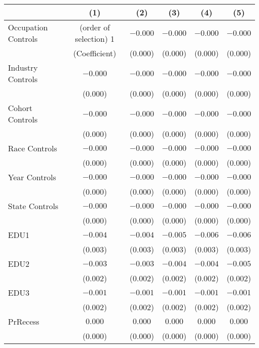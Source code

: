 \documentclass[12pt]{article}
\begin{document}
\begin{table}[ht]
\begin{tabular}{lccccc}
\toprule
                    & (1)     & (2)   & (3)    & (4)      & (5)         \\
\midrule
Occupation Controls      & (order of selection) 1  & $-0.000$    & $-0.000$  & $-0.000$   & $-0.000$    \\
                    & (Coefficient)   & (0.000)     & (0.000)   & (0.000)    & (0.000)     \\
Industry Controls      & $-0.000$  & $-0.000$    & $-0.000$  & $-0.000$   & $-0.000$    \\
                    & (0.000)   & (0.000)     & (0.000)   & (0.000)    & (0.000)     \\
Cohort Controls      & $-0.000$  & $-0.000$    & $-0.000$  & $-0.000$   & $-0.000$    \\
                    & (0.000)   & (0.000)     & (0.000)   & (0.000)    & (0.000)     \\
Race Controls      & $-0.000$  & $-0.000$    & $-0.000$  & $-0.000$   & $-0.000$    \\
                    & (0.000)   & (0.000)     & (0.000)   & (0.000)    & (0.000)     \\
Year Controls      & $-0.000$  & $-0.000$    & $-0.000$  & $-0.000$   & $-0.000$    \\
                    & (0.000)   & (0.000)     & (0.000)   & (0.000)    & (0.000)     \\
State Controls      & $-0.000$  & $-0.000$    & $-0.000$  & $-0.000$   & $-0.000$    \\
                    & (0.000)   & (0.000)     & (0.000)   & (0.000)    & (0.000)     \\
EDU1                & $-0.004$  & $-0.004$    & $-0.005$  & $-0.006$   & $-0.006$    \\
                    & (0.003)   & (0.003)     & (0.003)   & (0.003)    & (0.003)     \\
EDU2                & $-0.003$  & $-0.003$    & $-0.004$  & $-0.004$   & $-0.005$    \\
                    & (0.002)   & (0.002)     & (0.002)   & (0.002)    & (0.002)     \\
EDU3                & $-0.001$  & $-0.001$    & $-0.001$  & $-0.001$   & $-0.001$    \\
                    & (0.002)   & (0.002)     & (0.002)   & (0.002)    & (0.002)     \\
PrRecess            & $0.000$   & $0.000$     & $0.000$   & $0.000$    & $0.000$     \\
                    & (0.000)   & (0.000)     & (0.000)   & (0.000)    & (0.000)     \\

\end{tabular}
\end{table}
\end{document}
